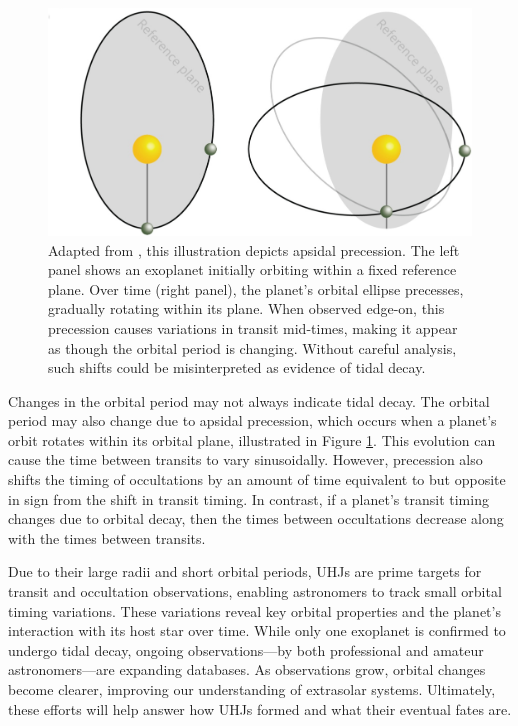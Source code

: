 \documentclass[oneside,12pt]{amsart}
\numberwithin{page}{section}
\begin{document}
\begin{figure}[htbp]
    \centering
    \includegraphics[width=0.8\linewidth]{figs/precession.jpg}
    \caption{Adapted from \citet{vervoort2022system}, this illustration depicts apsidal precession. The left panel shows an exoplanet initially orbiting within a fixed reference plane. Over time (right panel), the planet’s orbital ellipse precesses, gradually rotating within its plane. When observed edge-on, this precession causes variations in transit mid-times, making it appear as though the orbital period is changing. Without careful analysis, such shifts could be misinterpreted as evidence of tidal decay.}
    \label{fig:precession}
\end{figure}

Changes in the orbital period may not always indicate tidal decay. The orbital period may also change due to apsidal precession, which occurs when a planet's orbit rotates within its orbital plane, illustrated in Figure \ref{fig:precession}. This evolution can cause the time between transits to vary sinusoidally. However, precession also shifts the timing of occultations by an amount of time equivalent to but opposite in sign from the shift in transit timing. In contrast, if a planet's transit timing changes due to orbital decay, then the times between occultations decrease along with the times between transits.

Due to their large radii and short orbital periods, UHJs are prime targets for transit and occultation observations, enabling astronomers to track small orbital timing variations. These variations reveal key orbital properties and the planet’s interaction with its host star over time. While only one exoplanet is confirmed to undergo tidal decay, ongoing observations—by both professional and amateur astronomers—are expanding databases. As observations grow, orbital changes become clearer, improving our understanding of extrasolar systems. Ultimately, these efforts will help answer how UHJs formed and what their eventual fates are.
\end{document}
